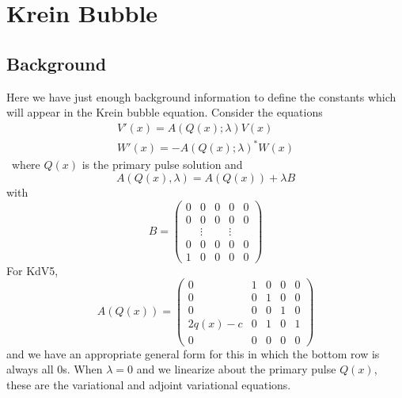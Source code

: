 \documentclass[thesis.tex]{subfiles}
\begin{document}
\chapter{Krein Bubble}

\section{Background}

Here we have just enough background information to define the constants which will appear in the Krein bubble equation. Consider the equations
\begin{align}
V'(x) = A(Q(x); \lambda) V(x)  \label{Veqlambda} \\
W'(x) = -A(Q(x); \lambda)^* W(x) \label{Weqlambda}
\end{align}\
where $Q(x)$ is the primary pulse solution and 
\[
A(Q(x), \lambda) = A(Q(x)) + \lambda B
\]
with 
\begin{equation*}
B = \begin{pmatrix}0 & 0 & 0 & 0 & 0 \\0 & 0 & 0 & 0 & 0 \\  & 
\vdots & & \vdots & \\0 & 0 & 0 & 0 & 0 \\1 & 0 & 0 & 0 & 0 \end{pmatrix} 
\end{equation*}
For KdV5, 
\begin{equation*}
A(Q(x)) = \begin{pmatrix}0 & 1 & 0 & 0 & 0 \\ 0 & 0 & 1 & 0 & 0 \\ 0 & 0 & 0 & 1 & 0 \\ 2 q(x) - c & 0 & 1 & 0 & 1 \\
0 & 0 & 0 & 0 & 0 
\end{pmatrix}
\end{equation*}
and we have an appropriate general form for this in which the bottom row is always all 0s. When $\lambda = 0$ and we linearize about the primary pulse $Q(x)$, these are the variational and adjoint variational equations.
\end{document}
